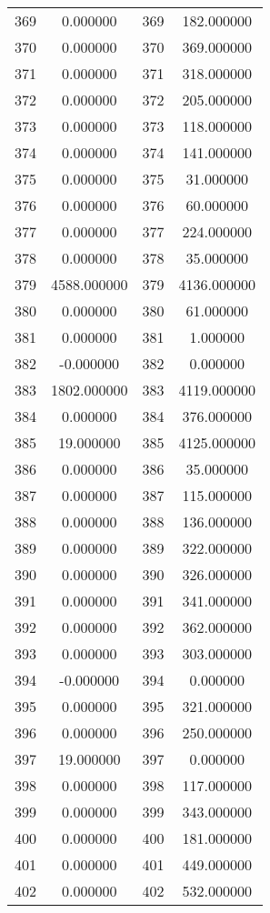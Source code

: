 \documentclass[12pt]{article}
\begin{document}
\begin{longtable}{@{}cccc@{}}
369 & 0.000000 & 369 & 182.000000 \\
370 & 0.000000 & 370 & 369.000000 \\
371 & 0.000000 & 371 & 318.000000 \\
372 & 0.000000 & 372 & 205.000000 \\
373 & 0.000000 & 373 & 118.000000 \\
374 & 0.000000 & 374 & 141.000000 \\
375 & 0.000000 & 375 & 31.000000 \\
376 & 0.000000 & 376 & 60.000000 \\
377 & 0.000000 & 377 & 224.000000 \\
378 & 0.000000 & 378 & 35.000000 \\
379 & 4588.000000 & 379 & 4136.000000 \\
380 & 0.000000 & 380 & 61.000000 \\
381 & 0.000000 & 381 & 1.000000 \\
382 & -0.000000 & 382 & 0.000000 \\
383 & 1802.000000 & 383 & 4119.000000 \\
384 & 0.000000 & 384 & 376.000000 \\
385 & 19.000000 & 385 & 4125.000000 \\
386 & 0.000000 & 386 & 35.000000 \\
387 & 0.000000 & 387 & 115.000000 \\
388 & 0.000000 & 388 & 136.000000 \\
389 & 0.000000 & 389 & 322.000000 \\
390 & 0.000000 & 390 & 326.000000 \\
391 & 0.000000 & 391 & 341.000000 \\
392 & 0.000000 & 392 & 362.000000 \\
393 & 0.000000 & 393 & 303.000000 \\
394 & -0.000000 & 394 & 0.000000 \\
395 & 0.000000 & 395 & 321.000000 \\
396 & 0.000000 & 396 & 250.000000 \\
397 & 19.000000 & 397 & 0.000000 \\
398 & 0.000000 & 398 & 117.000000 \\
399 & 0.000000 & 399 & 343.000000 \\
400 & 0.000000 & 400 & 181.000000 \\
401 & 0.000000 & 401 & 449.000000 \\
402 & 0.000000 & 402 & 532.000000 \\

\end{longtable}
\end{document}

